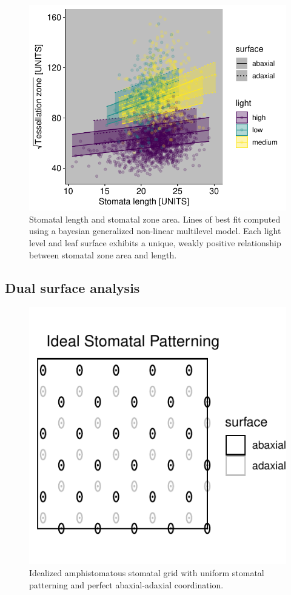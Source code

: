 \documentclass[12pt,halfline,a4paper,]{ouparticle}
\begin{document}
\begin{figure}[ht]
\includegraphics[width = \textwidth]{figures/length-area.pdf}
\caption{Stomatal length and stomatal zone area. Lines of best fit computed using a bayesian generalized non-linear multilevel model. Each light level and leaf surface exhibits a unique, weakly positive relationship between stomatal zone area and length.}
\label{fig:length-area}
\end{figure}

\hypertarget{dual-surface-analysis-1}{%
\subsection{Dual surface analysis}\label{dual-surface-analysis-1}}

\begin{figure}[ht]
\includegraphics[width = \textwidth]{figures/ideal-amphi-grid.pdf}
\caption{Idealized amphistomatous stomatal grid with uniform stomatal patterning and perfect abaxial-adaxial coordination.}
\label{fig:ideal-amphi-grid}
\end{figure}
\end{document}
